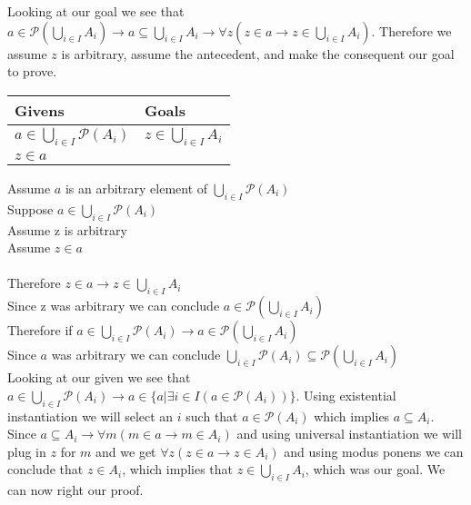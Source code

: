 \documentclass{article}
\newcommand{\n}{ \noindent }
\newcommand{\pwset}{\mathscr{P}}
\begin{document}
\n Looking at our goal we see that $a \in \pwset(\bigcup_{i \in I} A_i) \rightarrow a \subseteq \bigcup_{i \in I} A_i \rightarrow \forall z (z \in a \rightarrow z \in \bigcup_{i \in I} A_i ) $. Therefore we assume $z$ is arbitrary, assume the antecedent, and make the consequent our goal to prove. \\

\begin{table}[h]
\begin{tabular}{ll}
\hline
Givens & Goals   \\ \hline
$a \in \bigcup_{i \in I} \pwset(A_{i})$ & $z \in \bigcup_{i \in I} A_i $   \\
$z \in a$ & \\ \hline

\end{tabular}
\end{table}

\n Assume $a$ is an arbitrary element of $\bigcup_{i \in I} \pwset(A_{i})$ \\
\indent Suppose $a \in \bigcup_{i \in I} \pwset(A_{i})$ \\
\indent \indent Assume z is arbitrary \\
\indent \indent \indent Assume $z \in a$ \\
\indent \indent \indent {} \\
\indent \indent \indent Therefore $z \in a \rightarrow z \in \bigcup_{i \in I} A_i $ \\
\indent \indent Since z was arbitrary we can conclude $a \in \pwset(\bigcup_{i \in I} A_i)$ \\
\indent Therefore if $a \in \bigcup_{i \in I} \pwset(A_{i}) \rightarrow a \in \pwset(\bigcup_{i \in I} A_i)$ \\
\n Since $a$ was arbitrary we can conclude $\bigcup_{i \in I} \pwset(A_{i}) \subseteq \pwset (\bigcup_{i \in I} A_{i})$ \\

\n Looking at our given we see that $a \in \bigcup_{i \in I} \pwset(A_{i}) \rightarrow a \in \{ a | \exists i \in I (a \in \pwset(A_i)) \}$. Using existential instantiation we will select an $i$ such that $a \in \pwset(A_i)$ which implies $a \subseteq A_i$. Since $a \subseteq A_i \rightarrow \forall m(m \in a \rightarrow m \in A_i)$ and using universal instantiation we will plug in $z$ for $m$ and we get $\forall z(z \in a \rightarrow z \in A_i)$ and using modus ponens we can conclude that $z \in A_i$, which implies that $z \in \bigcup_{i \in I} A_i $, which was our goal. We can now right our proof. \\
\end{document}
